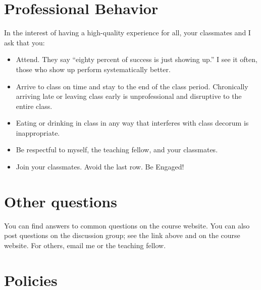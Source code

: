 \section*{Professional Behavior}
In the interest of having a high-quality experience for all, your classmates and I ask that you:
\begin{itemize}
\item Attend. They say ``eighty percent of success is just showing up.'' I see it often, those who show up perform systematically better.

\item Arrive to class on time and stay to the end of the class period. Chronically arriving late or leaving class early is unprofessional and disruptive to the entire class.

\item Eating or drinking in class in any way that interferes with class decorum is inappropriate.

\item Be respectful to myself, the teaching fellow, and your classmates.

\item Join your classmates. Avoid the last row. Be Engaged!
\end{itemize}


\section*{Other questions}

You can find answers to common questions on the course website. You can also post questions on the discussion group; see the link above and on the course website. For others, email me or the teaching fellow.

\section*{Policies}

